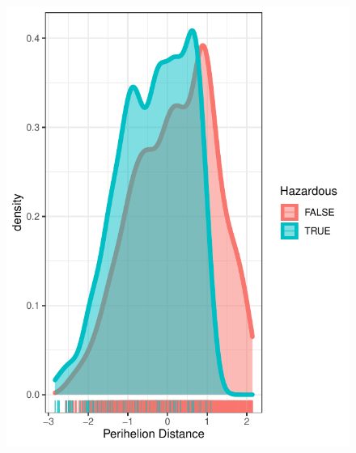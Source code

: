 \documentclass[12pt,%
               a4paper,%
               oneside,openany,%
               titlepage,%
               headinclude,footinclude,%
               BCOR5mm,%
               cleardoublepage=empty,%
               tablecaptionabove,%
               floatperchapter,
               ]{scrreprt}                 %
\begin{document}
\begin{figure}[ht]
  \begin{minipage}[b]{0.5\linewidth}
    \centering
    \includegraphics[width=.9\linewidth]{Figures/DENSITY_Perihelion_Distance.pdf}
    \vspace{4ex}
  \end{minipage} 
  \begin{minipage}[b]{0.5\linewidth}
    \centering

\end{minipage}
\end{figure}
\end{document}
